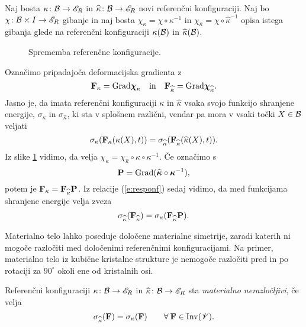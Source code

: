 Naj bosta $\kappa\colon\mathcal B\to\mathscr E_R$ in $\widehat{\kappa}\colon\mathcal B\to\mathscr E_R$ novi referenčni konfiguraciji.
Naj bo $\chi\colon\mathcal B\times I\to\mathscr E_R$ gibanje in naj bosta
$\chi_{\kappa}=\chi\circ\kappa^{-1}$ in $\chi_{\widehat{\kappa}}=\chi\circ\widehat{\kappa}^{-1}$
opisa istega gibanja glede na referenčni konfiguraciji $\kappa(\mathcal B)$ in $\widehat{\kappa}(\mathcal B)$.
\begin{figure}[h] \begin{center}
	
	\caption{Sprememba referenčne konfiguracije.}
	\label{pic:diagram}
\end{center} \end{figure}
Označimo pripadajoča deformacijska gradienta z
\[
	\mathbf F_{\kappa}=\mathrm{Grad}\boldsymbol \chi_{\kappa}\quad \mathrm{in}\quad
	\mathbf F_{\widehat{\kappa}}=\mathrm{Grad}\boldsymbol \chi_{\widehat{\kappa}}.
\]
Jasno je, da imata referenčni konfiguraciji $\kappa$ in $\widehat{\kappa}$ vsaka
svojo funkcijo shranjene energije, $\sigma_{\kappa}$ in $\sigma_{\widehat{\kappa}}$,
ki sta v splošnem različni, vendar pa mora v vsaki točki $X\in\mathcal B$ veljati
\begin{equation} \label{e:responf}
	\sigma_{\kappa}(\mathbf F_{\kappa}(\kappa(X),t))
	=\sigma_{\widehat{\kappa}}(\mathbf F_{\widehat{\kappa}}(\widehat{\kappa}(X),t)).
\end{equation}
Iz slike \ref{pic:diagram} vidimo, da velja $\chi_{\kappa}=\chi_{\widehat{\kappa}}\circ\widehat{\kappa}\circ\kappa^{-1}$.
Če označimo s
\begin{equation} \label{e:pupa}
	\mathbf P=\mathrm{Grad}(\widehat{\boldsymbol \kappa}\circ\boldsymbol \kappa^{-1}),
\end{equation}
potem je $\mathbf F_{\kappa}=\mathbf F_{\widehat{\kappa}}\mathbf P$. Iz relacije (\ref{e:responf})
sedaj vidimo, da med funkcijama shranjene energije velja zveza
\begin{equation} \label{e:dolgnoc}
	\sigma_{\widehat{\kappa}}(\mathbf F_{\widehat{\kappa}})
	=\sigma_{\kappa}(\mathbf F_{\widehat{\kappa}}\mathbf P).
\end{equation}

Materialno telo lahko poseduje določene materialne simetrije, zaradi katerih ni mogoče razločiti
med določenimi referenčnimi konfiguracijami. Na primer, materialno telo iz
kubične kristalne strukture je nemogoče razločiti pred in po rotaciji za
$90^{\circ}$ okoli ene od kristalnih osi.

\begin{definicija}
	Referenčni konfiguraciji $\kappa\colon\mathcal B\to\mathscr E_R$ in $\widehat{\kappa}\colon\mathcal B\to\mathscr E_R$
	sta \emph{materialno nerazločljivi}, če velja
	\begin{equation} \label{e:grarefc}
		\sigma_{\widehat{\kappa}}(\mathbf F)=\sigma_{\kappa}(\mathbf F)
		\qquad\forall\:\mathbf F\in\mathrm{Inv}(\mathscr V).
	\end{equation}
\end{definicija}

